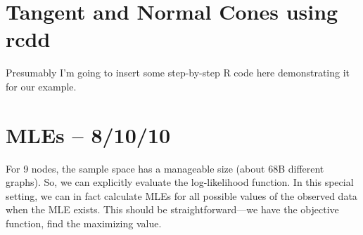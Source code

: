 \documentclass{amsbook}
\theoremstyle{definition}
\theoremstyle{remark}
\begin{document}
\section{Tangent and Normal Cones using rcdd}
Presumably I'm going to insert some step-by-step R code here demonstrating it for our example.

\section{MLEs -- 8/10/10}
For 9 nodes, the sample space has a manageable size (about 68B different graphs).  So, 
we can explicitly evaluate the log-likelihood function.  In this special setting, we 
can in fact calculate MLEs for all possible values of the observed data when the MLE exists.
This should be straightforward---we have the objective function, find the maximizing value.
\end{document}
